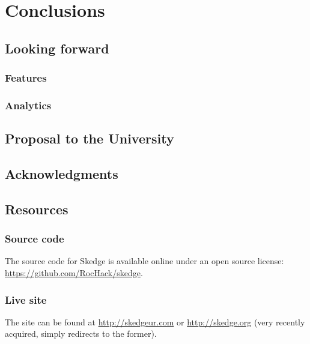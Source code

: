
\chapter{Conclusions}

\section{Looking forward}

\subsection{Features}

\subsection{Analytics}


\section{Proposal to the University}


\section{Acknowledgments}


\section{Resources}

\subsection*{Source code}

The source code for Skedge is available online under an open source license:\\
\url{https://github.com/RocHack/skedge}.

\subsection*{Live site}

\noindent The site can be found at \url{http://skedgeur.com} or \url{http://skedge.org} (very recently acquired, simply redirects to the former).